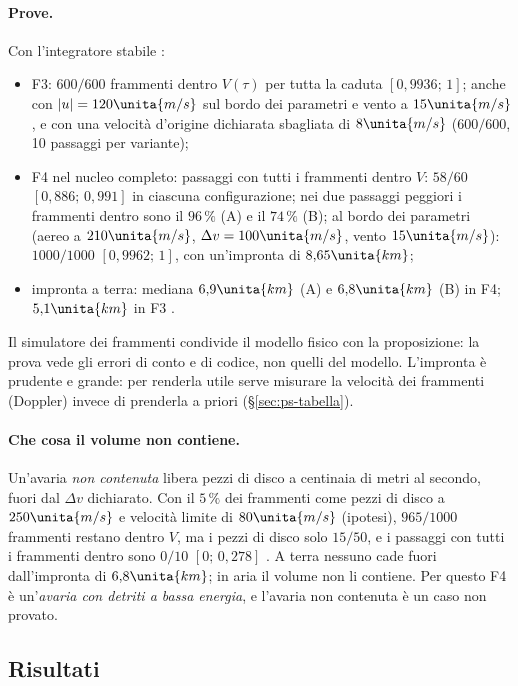 \paragraph{Prove.} Con l'integratore stabile :
\begin{itemize}
\item F3: $600/600$ frammenti dentro $V(\tau)$ per tutta la caduta $[0{,}9936;\,1]$; anche con $|u|=120\unita{m/s}$ sul bordo dei parametri e vento a $15\unita{m/s}$, e con una velocità d'origine dichiarata sbagliata di $8\unita{m/s}$ ($600/600$, 10 passaggi per variante);
\item F4 nel nucleo completo: passaggi con tutti i frammenti dentro $V$: $58/60$ $[0{,}886;\,0{,}991]$ in ciascuna configurazione; nei due passaggi peggiori i frammenti dentro sono il $96\,\%$ (A) e il $74\,\%$ (B); al bordo dei parametri (aereo a $210\unita{m/s}$, $\Delta v=100\unita{m/s}$, vento $15\unita{m/s}$): $1000/1000$ $[0{,}9962;\,1]$, con un'impronta di $8{,}65\unita{km}$;
\item impronta a terra: mediana $6{,}9\unita{km}$ (A) e $6{,}8\unita{km}$ (B) in F4; $5{,}1\unita{km}$ in F3 .
\end{itemize}
Il simulatore dei frammenti condivide il modello fisico con la proposizione: la prova vede gli errori di conto e di codice, non quelli del modello. L'impronta è prudente e grande: per renderla utile serve misurare la velocità dei frammenti (Doppler) invece di prenderla a priori (\S\ref{sec:ps-tabella}).

\paragraph{Che cosa il volume non contiene.} Un'avaria \emph{non contenuta} libera pezzi di disco a centinaia di metri al secondo, fuori dal $\Delta v$ dichiarato. Con il $5\,\%$ dei frammenti come pezzi di disco a $250\unita{m/s}$ e velocità limite di $80\unita{m/s}$ (ipotesi), $965/1000$ frammenti restano dentro $V$, ma i pezzi di disco solo $15/50$, e i passaggi con tutti i frammenti dentro sono $0/10$ $[0;\,0{,}278]$ . A terra nessuno cade fuori dall'impronta di $6{,}8\unita{km}$; in aria il volume non li contiene. Per questo F4 è un'\emph{avaria con detriti a bassa energia}, e l'avaria non contenuta è un caso non provato.

\subsection{Risultati}\label{sec:vo-risultati}

